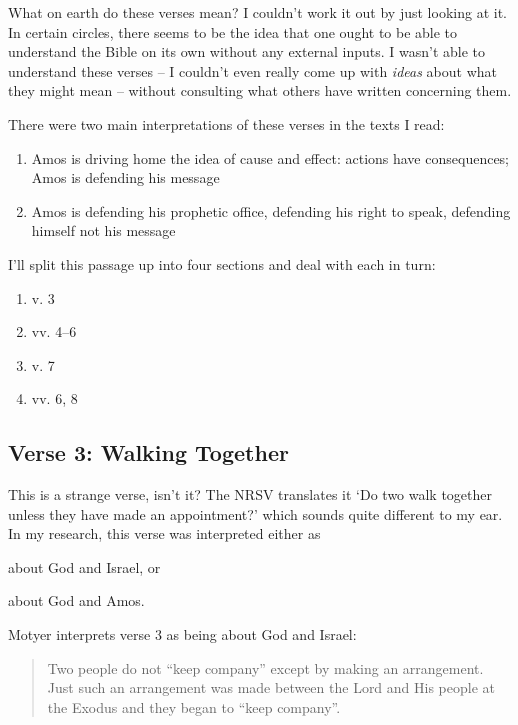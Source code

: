What on earth do these verses mean? I couldn't work it out by just looking at
it. In certain circles, there seems to be the idea that one ought to be able to
understand the Bible on its own without any external inputs. I wasn't able to
understand these verses -- I couldn't even really come up with \textit{ideas}
about what they might mean -- without consulting what others have written
concerning them.

There were two main interpretations of these verses in the texts I read:

\begin{enumerate}
    \item Amos is driving home the idea of cause and effect: actions have
        consequences; Amos is defending his message
    \item Amos is defending his prophetic office, defending his right to speak,
        defending himself not his message
\end{enumerate}

I'll split this passage up into four sections and deal with each in turn:

\begin{enumerate}
    \item v. 3
    \item vv. 4--6
    \item v. 7
    \item vv. 6, 8
\end{enumerate}

\subsection{Verse 3: Walking Together}

This is a strange verse, isn't it? The NRSV translates it `Do two walk together
unless they have made an appointment?' which sounds quite different to my ear.
In my research, this verse was interpreted either as
\begin{inparaenum}[(1)]
\item about God and Israel, or
\item about God and Amos.
\end{inparaenum}

Motyer interprets verse 3 as being about God and Israel:

\begin{quote}
    Two people do not \enquote{keep company} except by making an arrangement.
    Just such an arrangement was made between the Lord and His people at the
    Exodus and they began to \enquote{keep company}.
    \autocite[70]{motyer:1974}
\end{quote}

